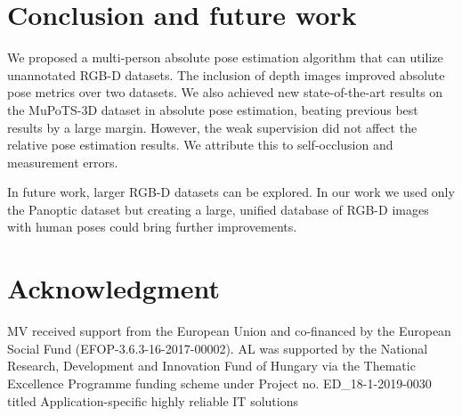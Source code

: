 \documentclass[runningheads]{llncs}
\begin{document}
\section{Conclusion and future work}
We proposed a multi-person absolute pose estimation algorithm that can utilize unannotated RGB\nobreakdash-D datasets. The inclusion of depth images improved absolute pose metrics over two datasets. We also achieved new state-of-the-art results on the MuPoTS-3D dataset in absolute pose estimation, beating previous best results by a large margin. However, the weak supervision did not affect the relative pose estimation results. We attribute this to self-occlusion and measurement errors.

In future work, larger RGB\nobreakdash-D datasets can be explored. In our work we used only the Panoptic dataset but creating a large, unified database of RGB\nobreakdash-D images with human poses could bring further improvements. 

\section*{Acknowledgment}
 MV received support from the European Union and co-financed by the European Social Fund (EFOP-3.6.3-16-2017-00002). AL was supported by the National Research, Development and Innovation Fund of Hungary via the Thematic Excellence Programme funding scheme under Project no. ED\_18-1-2019-0030 titled Application-specific highly reliable IT solutions 




\end{document}
